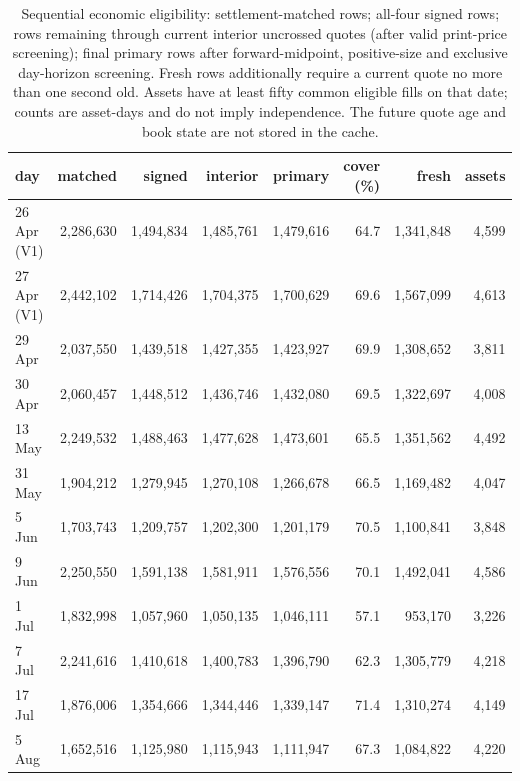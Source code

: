 \begin{table}[htbp]
\centering\scriptsize\setlength{\tabcolsep}{3pt}
\begin{tabular}{lrrrrrrr}
\toprule
day & matched & signed & interior & primary & cover (\%) & fresh & assets \\
\midrule
26 Apr (V1) & 2{,}286{,}630 & 1{,}494{,}834 & 1{,}485{,}761 & 1{,}479{,}616 & 64.7 & 1{,}341{,}848 & 4{,}599 \\
27 Apr (V1) & 2{,}442{,}102 & 1{,}714{,}426 & 1{,}704{,}375 & 1{,}700{,}629 & 69.6 & 1{,}567{,}099 & 4{,}613 \\
29 Apr & 2{,}037{,}550 & 1{,}439{,}518 & 1{,}427{,}355 & 1{,}423{,}927 & 69.9 & 1{,}308{,}652 & 3{,}811 \\
30 Apr & 2{,}060{,}457 & 1{,}448{,}512 & 1{,}436{,}746 & 1{,}432{,}080 & 69.5 & 1{,}322{,}697 & 4{,}008 \\
13 May & 2{,}249{,}532 & 1{,}488{,}463 & 1{,}477{,}628 & 1{,}473{,}601 & 65.5 & 1{,}351{,}562 & 4{,}492 \\
31 May & 1{,}904{,}212 & 1{,}279{,}945 & 1{,}270{,}108 & 1{,}266{,}678 & 66.5 & 1{,}169{,}482 & 4{,}047 \\
5 Jun & 1{,}703{,}743 & 1{,}209{,}757 & 1{,}202{,}300 & 1{,}201{,}179 & 70.5 & 1{,}100{,}841 & 3{,}848 \\
9 Jun & 2{,}250{,}550 & 1{,}591{,}138 & 1{,}581{,}911 & 1{,}576{,}556 & 70.1 & 1{,}492{,}041 & 4{,}586 \\
1 Jul & 1{,}832{,}998 & 1{,}057{,}960 & 1{,}050{,}135 & 1{,}046{,}111 & 57.1 & 953{,}170 & 3{,}226 \\
7 Jul & 2{,}241{,}616 & 1{,}410{,}618 & 1{,}400{,}783 & 1{,}396{,}790 & 62.3 & 1{,}305{,}779 & 4{,}218 \\
17 Jul & 1{,}876{,}006 & 1{,}354{,}666 & 1{,}344{,}446 & 1{,}339{,}147 & 71.4 & 1{,}310{,}274 & 4{,}149 \\
5 Aug & 1{,}652{,}516 & 1{,}125{,}980 & 1{,}115{,}943 & 1{,}111{,}947 & 67.3 & 1{,}084{,}822 & 4{,}220 \\
\bottomrule
\end{tabular}
\caption{Sequential economic eligibility: settlement-matched rows; all-four signed rows; rows remaining through current interior uncrossed quotes (after valid print-price screening); final primary rows after forward-midpoint, positive-size and exclusive day-horizon screening. Fresh rows additionally require a current quote no more than one second old. Assets have at least fifty common eligible fills on that date; counts are asset-days and do not imply independence. The future quote age and book state are not stored in the cache.}
\label{tab:cached-economic-eligibility}
\end{table}
